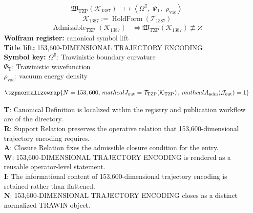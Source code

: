\noindent
\begin{minipage}[t]{0.48\linewidth}
\begingroup
\small
\[
\begin{aligned}
\mathfrak{W}_{\mathrm{TZP}}\!\left(\mathcal{K}_{1387}\right)
&\longmapsto
\left\langle \Omega^{\mathbb{T}},\; \Psi_{\mathrm{T}},\; \rho_{\mathrm{vac}} \right\rangle
\end{aligned}
\]
\[
\mathcal{K}_{1387}
:=
\operatorname{HoldForm}\!\left(\mathcal{T}_{1387}\right)
\]
\[
\begin{aligned}
\operatorname{Admissible}_{\mathrm{TZP}}\!\left(\mathcal{K}_{1387}\right)
&\Longleftrightarrow
\mathfrak{W}_{\mathrm{TZP}}\!\left(\mathcal{K}_{1387}\right)\not\equiv\varnothing
\end{aligned}
\]
\textbf{Wolfram register:} canonical symbol lift\\
\textbf{Title lift:} 153,600-DIMENSIONAL TRAJECTORY ENCODING\\
\textbf{Symbol key:} \(\Omega^{\mathbb{T}}\): Trawinistic boundary curvature\\ \(\Psi_{\mathrm{T}}\): Trawinistic wavefunction\\ \(\rho_{\mathrm{vac}}\): vacuum energy density
\par
\endgroup
\end{minipage}\hfill
\begin{minipage}[t]{0.48\linewidth}
\[
\tzpnormalizewrap{N=153,600,\,mathcal{J}_{\mathrm{out}} = \mathcal{T}_{\mathrm{TZP}}\!\left(\mathcal{K}_{\mathrm{TZP}}\right),\,mathcal{A}_{\mathrm{adm}}\!\left(\mathcal{J}_{\mathrm{out}}\right)=1}
\]

\small
\textbf{T}: Canonical Definition is localized within the registry and publication workflow arc of the directory.\\
\textbf{R}: Support Relation preserves the operative relation that 153,600-dimensional trajectory encoding requires.\\
\textbf{A}: Closure Relation fixes the admissible closure condition for the entry.\\
\textbf{W}: 153,600-DIMENSIONAL TRAJECTORY ENCODING is rendered as a reusable operator-level statement.\\
\textbf{I}: The informational content of 153,600-dimensional trajectory encoding is retained rather than flattened.\\
\textbf{N}: 153,600-DIMENSIONAL TRAJECTORY ENCODING closes as a distinct normalized TRAWIN object.
\normalsize
\end{minipage}

